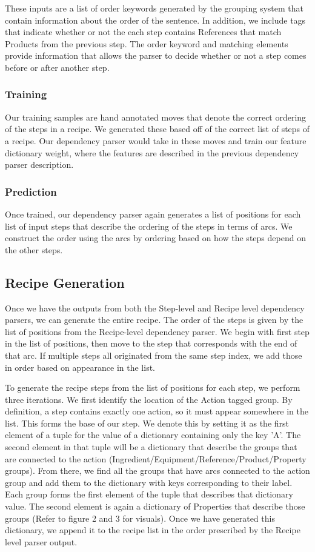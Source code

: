 These inputs are a list of order keywords generated by the grouping system that contain information about the order of the sentence. In addition, we include tags that indicate whether or not the each step contains References that match Products from the previous step. The order keyword and matching elements provide information that allows the parser to decide whether or not a step comes before or after another step. 

\subsubsection{Training}
Our training samples are hand annotated moves that denote the correct ordering of the steps in a recipe. We generated these based off of the correct list of steps of a recipe. Our dependency parser would take in these moves and train our feature dictionary weight, where the features are described in the previous dependency parser description. 

\subsubsection{Prediction}
Once trained, our dependency parser again generates a list of positions for each list of input steps that describe the ordering of the steps in terms of arcs. We construct the order using the arcs by ordering based on how the steps depend on the other steps. 

\subsection{Recipe Generation}
Once we have the outputs from both the Step-level and Recipe level dependency parsers, we can generate the entire recipe. The order of the steps is given by the list of positions from the Recipe-level dependency parser. We begin with first step in the list of positions, then move to the step that corresponds with the end of that arc. If multiple steps all originated from the same step index, we add those in order based on appearance in the list. 

To generate the recipe steps from the list of positions for each step, we perform three iterations. We first identify the location of the Action tagged group. By definition, a step contains exactly one action, so it must appear somewhere in the list. This forms the base of our step. We denote this by setting it as the first element of a tuple for the value of a dictionary containing only the key 'A'. The second element in that tuple will be a dictionary that describe the groups that are connected to the action (Ingredient/Equipment/Reference/Product/Property groups). From there, we find all the groups that have arcs connected to the action group and add them to the dictionary with keys corresponding to their label. Each group forms the first element of the tuple that describes that dictionary value. The second element is again a dictionary of Properties that describe those groups (Refer to figure 2 and 3 for visuals). Once we have generated this dictionary, we append it to the recipe list in the order prescribed by the Recipe level parser output.

